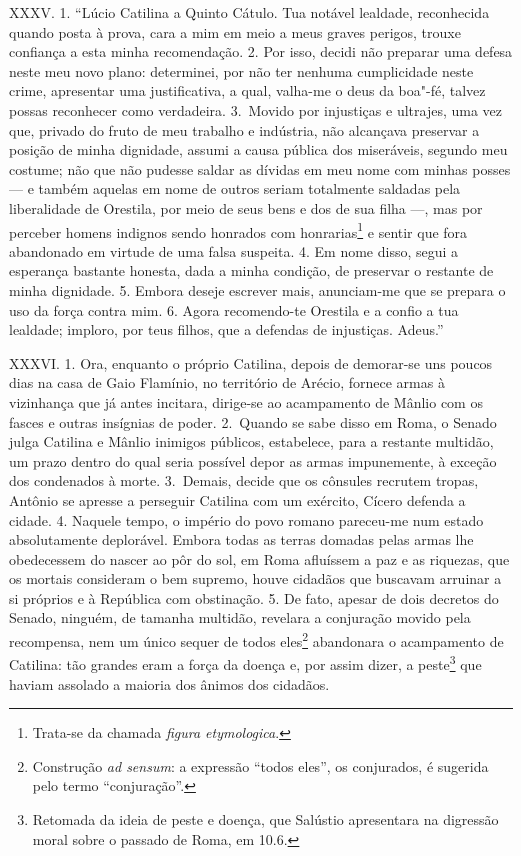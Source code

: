 XXXV. 1. “Lúcio Catilina a Quinto Cátulo. Tua notável lealdade, reconhecida
quando posta à prova, cara a mim em meio a meus graves perigos, trouxe
confiança a esta minha recomendação. 2. Por isso, decidi não preparar uma defesa
neste meu novo plano: determinei, por não ter nenhuma cumplicidade neste crime,
apresentar uma justificativa, a qual, valha-me o deus da boa"-fé, talvez possas
reconhecer como verdadeira. 3.~Movido por injustiças e ultrajes, uma vez que,
privado do fruto de meu trabalho e indústria, não alcançava preservar a posição
de minha dignidade, assumi a causa pública dos miseráveis, segundo meu costume;
não que não pudesse saldar as dívidas em meu nome com minhas posses --- e
também aquelas em nome de outros seriam totalmente saldadas pela liberalidade
de Orestila, por meio de seus bens e dos de sua filha ---, mas por perceber
homens indignos sendo honrados com honrarias\footnote{Trata-se da chamada
\emph{figura etymologica}.} e sentir que fora abandonado em virtude de uma
falsa suspeita. 4. Em nome disso, segui a esperança bastante honesta, dada a
minha condição, de preservar o restante de minha dignidade. 5. Embora deseje
escrever mais, anunciam-me que se prepara o uso da força contra mim. 6. Agora
recomendo-te Orestila e a confio a tua lealdade; imploro, por teus filhos, que
a defendas de injustiças. Adeus.”

XXXVI. 1. Ora, enquanto o próprio Catilina, depois de demorar-se uns poucos
dias na casa de Gaio Flamínio, no território de Arécio, fornece armas à vizinhança
que já antes incitara, dirige-se ao acampamento de Mânlio com os fasces e
outras insígnias de poder. 2.~Quando se sabe disso em Roma, o Senado julga
Catilina e Mânlio inimigos públicos, estabelece, para a restante multidão, um
prazo dentro do qual seria possível depor as armas impunemente, à exceção dos
condenados à morte. 3.~Demais, decide que os cônsules recrutem tropas, Antônio
se apresse a perseguir Catilina com um exército, Cícero defenda a cidade. 4.
Naquele tempo, o império do povo romano pareceu-me num estado absolutamente
deplorável. Embora todas as terras domadas pelas armas lhe obedecessem do
nascer ao pôr do sol, em Roma afluíssem a paz e as riquezas, que os mortais
consideram o bem supremo, houve cidadãos que buscavam arruinar a si próprios e
à República com obstinação. 5. De fato, apesar de dois decretos do Senado,
ninguém, de tamanha multidão, revelara a conjuração movido pela recompensa,
nem um único sequer de todos eles\footnote{Construção \emph{ad sensum}: a
expressão ``todos eles'', os conjurados, é sugerida pelo termo
``conjuração''.} abandonara o acampamento de Catilina: tão  grandes eram a
força da doença e, por assim dizer, a peste\footnote{Retomada da ideia de peste
e doença, que Salústio apresentara na digressão moral sobre o passado de Roma, em 10.6.} que haviam assolado a maioria dos ânimos dos cidadãos.

